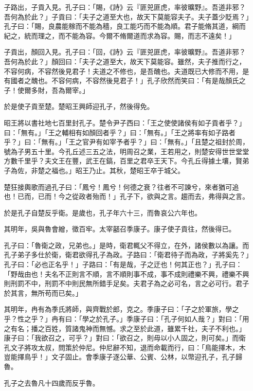 \begin{pinyinscope}
子路出，子貢入見。孔子曰：「賜，《詩》云『匪兕匪虎，率彼曠野』。吾道非邪？吾何為於此？」子貢曰：「夫子之道至大也，故天下莫能容夫子。夫子蓋少貶焉？」孔子曰：「賜，良農能稼而不能為穡，良工能巧而不能為順。君子能脩其道，綱而紀之，統而理之，而不能為容。今爾不脩爾道而求為容。賜，而志不遠矣！」

子貢出，顏回入見。孔子曰：「回，《詩》云『匪兕匪虎，率彼曠野』。吾道非邪？吾何為於此？」顏回曰：「夫子之道至大，故天下莫能容。雖然，夫子推而行之，不容何病，不容然後見君子！夫道之不修也，是吾醜也。夫道既已大修而不用，是有國者之醜也。不容何病，不容然後見君子！」孔子欣然而笑曰：「有是哉顏氏之子！使爾多財，吾為爾宰。」

於是使子貢至楚。楚昭王興師迎孔子，然後得免。

昭王將以書社地七百里封孔子。楚令尹子西曰：「王之使使諸侯有如子貢者乎？」曰：「無有。」「王之輔相有如顏回者乎？」曰：「無有。」「王之將率有如子路者乎？」曰：「無有。」「王之官尹有如宰予者乎？」曰：「無有。」「且楚之祖封於周，號為子男五十里。今孔丘述三五之法，明周召之業，王若用之，則楚安得世世堂堂方數千里乎？夫文王在豐，武王在鎬，百里之君卒王天下。今孔丘得據土壤，賢弟子為佐，非楚之福也。」昭王乃止。其秋，楚昭王卒于城父。

楚狂接輿歌而過孔子曰：「鳳兮！鳳兮！何德之衰？往者不可諫兮，來者猶可追也！已而，已而！今之從政者殆而！」孔子下，欲與之言。趨而去，弗得與之言。

於是孔子自楚反乎衛。是歲也，孔子年六十三，而魯哀公六年也。

其明年，吳與魯會繒，徵百牢。太宰嚭召季康子。康子使子貢往，然後得已。

孔子曰：「魯衛之政，兄弟也。」是時，衛君輒父不得立，在外，諸侯數以為讓。而孔子弟子多仕於衛，衛君欲得孔子為政。子路曰：「衛君待子而為政，子將奚先？」孔子曰：「必也正名乎！」子路曰：「有是哉，子之迂也！何其正也？」孔子曰：「野哉由也！夫名不正則言不順，言不順則事不成，事不成則禮樂不興，禮樂不興則刑罰不中，刑罰不中則民無所錯手足矣。夫君子為之必可名，言之必可行。君子於其言，無所苟而已矣。」

其明年，冉有為季氏將師，與齊戰於郎，克之。季康子曰：「子之於軍旅，學之乎？性之乎？」冉有曰：「學之於孔子。」季康子曰：「孔子何如人哉？」對曰：「用之有名；播之百姓，質諸鬼神而無憾。求之至於此道，雖累千社，夫子不利也。」康子曰：「我欲召之，可乎？」對曰：「欲召之，則毋以小人固之，則可矣。」而衛孔文子將攻太叔，問策於仲尼。仲尼辭不知，退而命載而行，曰：「鳥能擇木，木豈能擇鳥乎！」文子固止。會季康子逐公華、公賓、公林，以幣迎孔子，孔子歸魯。

孔子之去魯凡十四歲而反乎魯。


\end{pinyinscope}
